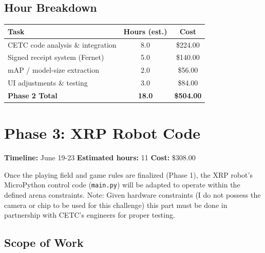 \documentclass[a4paper]{article}
\begin{document}
\subsection*{Hour Breakdown}

\begin{center}
\begin{tabular}{lcc}
\toprule
\textbf{Task} & \textbf{Hours (est.)} & \textbf{Cost} \\
\midrule
CETC code analysis \& integration & 8.0 & \$224.00 \\
Signed receipt system (Fernet) & 5.0 & \$140.00 \\
mAP / model-size extraction & 2.0 & \$56.00 \\
UI adjustments \& testing & 3.0 & \$84.00 \\
\midrule
\textbf{Phase 2 Total} & \textbf{18.0} & \textbf{\$504.00} \\
\bottomrule
\end{tabular}
\end{center}

\section*{Phase 3: XRP Robot Code}

\noindent\textbf{Timeline:} June 19-23 \hfill \textbf{Estimated hours:} 11 \hfill \textbf{Cost:} \$308.00

\vspace{0.5em}

Once the playing field and game rules are finalized (Phase 1), the XRP robot's MicroPython control code (\texttt{main.py}) will be adapted to operate within the defined arena constraints. Note: Given hardware constraints (I do not possess the camera or chip to be used for this challenge) this part must be done in partnership with CETC's engineers for proper testing.

\subsection*{Scope of Work}
\end{document}
